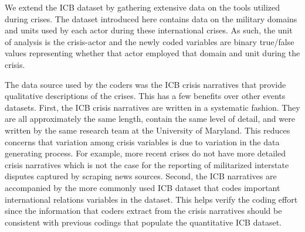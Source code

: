 \documentclass[12pt,letterpaper]{article}
\begin{document}
		We extend the ICB dataset by gathering extensive data on the tools utilized during crises. The dataset introduced here contains data on the military domains and units used by each actor during these international crises. As such, the unit of analysis is the crisis-actor and the newly coded variables are binary true/false values representing whether that actor employed that domain and unit during the crisis.
		
		The data source used by the coders was the ICB crisis narratives that provide qualitative descriptions of the crises. This has a few benefits over other events datasets. First, the ICB crisis narratives are written in a systematic fashion. They are all approximately the same length, contain the same level of detail, and were written by the same research team at the University of Maryland. This reduces concerns that variation among crisis variables is due to variation in the data generating process. For example, more recent crises do not have more detailed crisis narratives which is not the case for the reporting of militarized interstate disputes captured by scraping news sources. Second, the ICB narratives are accompanied by the more commonly used ICB dataset that codes important international relations variables in the dataset. This helps verify the coding effort since the information that coders extract from the crisis narratives should be consistent with previous codings that populate the quantitative ICB dataset.
		
\end{document}
